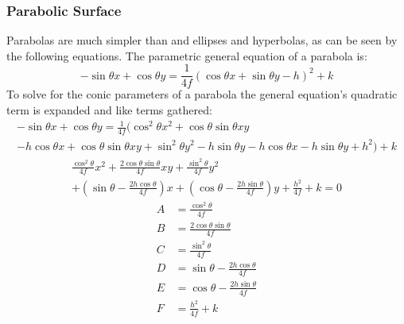 \subsubsection{Parabolic Surface}
Parabolas are much simpler than and ellipses and hyperbolas, as can be seen by the following equations.
The parametric general equation of a parabola is:
\begin{equation}
	-\sin\theta x + \cos\theta y = \frac{1}{4f}(\cos\theta x + \sin\theta y - h)^2 + k
\end{equation}
To solve for the conic parameters of a parabola the general equation's quadratic term is expanded and like terms gathered:
\begin{multline*}
	-\sin\theta x + \cos\theta y = \frac{1}{4f}(\cos^2\theta x^2 + \cos\theta\sin\theta xy \\
	- h \cos\theta x + \cos\theta\sin\theta xy + \sin^2\theta y^2 - h\sin\theta y - h \cos\theta x - h \sin\theta y + h^2) + k
\end{multline*}
\begin{multline*}
	\frac{\cos^2\theta}{4f} x^2 + \frac{2\cos\theta\sin\theta}{4f} xy + \frac{\sin^2\theta}{4f} y^2 \\
	+ \left(\sin\theta - \frac{2h \cos\theta}{4f}\right)x + \left(\cos\theta - \frac{2h \sin\theta}{4f}\right)y + \frac{h^2}{4f} + k = 0
\end{multline*}
\begin{align}
	A &= \frac{\cos^2\theta}{4f} \\
	B &= \frac{2\cos\theta\sin\theta}{4f} \\
	C &= \frac{\sin^2\theta}{4f} \\
	D &= \sin\theta - \frac{2h \cos\theta}{4f} \\
	E &= \cos\theta - \frac{2h \sin\theta}{4f} \\
	F &= \frac{h^2}{4f} + k
\end{align}

